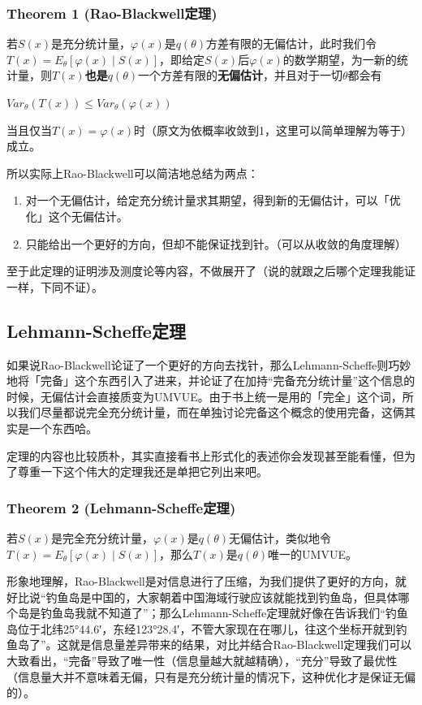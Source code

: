 \documentclass[10pt, a4paper]{article}
\begin{document}
\subsubsection*{Theorem 1 (Rao-Blackwell定理)}
若$S(x)$是充分统计量，$\varphi(x)$是$q(\theta)$方差有限的无偏估计，此时我们令$T(x)=E_\theta [\varphi(x) \mid S(x)]$，即给定$S(x)$后$\varphi(x)$的数学期望，为一新的统计量，则$T(x)$\textbf{也是}$q(\theta)$一个方差有限的\textbf{无偏估计}，并且对于一切$\theta$都会有
\begin{center}
    $Var_\theta (T(x)) \leq Var_\theta (\varphi(x))$ 
\end{center}
当且仅当$T(x) = \varphi(x)$时（原文为依概率收敛到1，这里可以简单理解为等于）成立。\\\par

所以实际上Rao-Blackwell可以简洁地总结为两点：
\begin{enumerate}
    \item 对一个无偏估计，给定充分统计量求其期望，得到新的无偏估计，可以「优化」这个无偏估计。
    \item 只能给出一个更好的方向，但却不能保证找到针。（可以从收敛的角度理解）
\end{enumerate}

至于此定理的证明涉及测度论等内容，不做展开了（说的就跟之后哪个定理我能证一样，下同不证）。

\subsection{Lehmann-Scheffe定理}
如果说Rao-Blackwell论证了一个更好的方向去找针，那么Lehmann-Scheffe则巧妙地将「完备」这个东西引入了进来，并论证了在加持“完备充分统计量”这个信息的时候，无偏估计会直接质变为UMVUE。由于书上统一是用的「完全」这个词，所以我们尽量都说完全充分统计量，而在单独讨论完备这个概念的使用完备，这俩其实是一个东西哈。\par

定理的内容也比较质朴，其实直接看书上形式化的表述你会发现甚至能看懂，但为了尊重一下这个伟大的定理我还是单把它列出来吧。\par

\subsubsection*{Theorem 2 (Lehmann-Scheffe定理)}
若$S(x)$是完全充分统计量，$\varphi(x)$是$q(\theta)$无偏估计，类似地令$T(x)=E_\theta [\varphi(x) \mid S(x)]$，那么$T(x)$是$q(\theta)$唯一的UMVUE。\\\par
形象地理解，Rao-Blackwell是对信息进行了压缩，为我们提供了更好的方向，就好比说“钓鱼岛是中国的，大家朝着中国海域行驶应该就能找到钓鱼岛，但具体哪个岛是钓鱼岛我就不知道了”；那么Lehmann-Scheffe定理就好像在告诉我们“钓鱼岛位于北纬25°44.6′，东经123°28.4′，不管大家现在在哪儿，往这个坐标开就到钓鱼岛了”。这就是信息量差异带来的结果，对比并结合Rao-Blackwell定理我们可以大致看出，“完备”导致了唯一性（信息量越大就越精确），“充分”导致了最优性（信息量大并不意味着无偏，只有是充分统计量的情况下，这种优化才是保证无偏的）。\par
\end{document}
